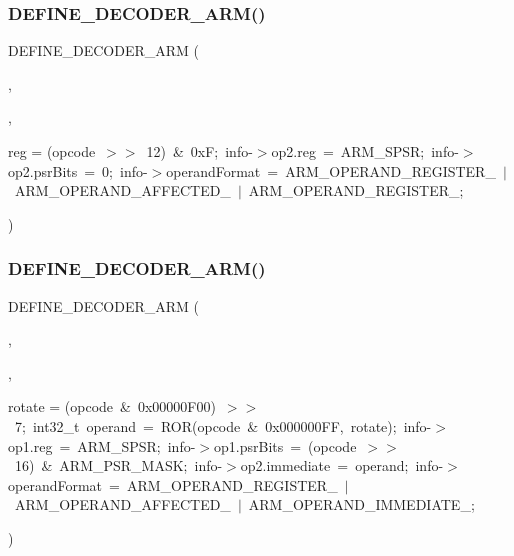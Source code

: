 \subsubsection{\texorpdfstring{D\+E\+F\+I\+N\+E\+\_\+\+D\+E\+C\+O\+D\+E\+R\+\_\+\+A\+R\+M()}{DEFINE\_DECODER\_ARM()}\hspace{0.1cm}{\footnotesize\ttfamily [5/6]}}
{\footnotesize\ttfamily D\+E\+F\+I\+N\+E\+\_\+\+D\+E\+C\+O\+D\+E\+R\+\_\+\+A\+RM (\begin{DoxyParamCaption}\item[{M\+R\+SR}]{,  }\item[{\mbox{\hyperlink{decoder-arm_8c_a08e2b0a56adcc93949282d6c828080ff}{M\+RS}}}]{,  }\item[{\mbox{\hyperlink{libretro_8h_a283ad41e4809f9c0ebe736a9861d8a91}{info}}-\/$>$op1.}]{reg = {\ttfamily (opcode~$>$$>$~12)~\&~0xF;~info-\/$>$op2.reg~=~ARM\+\_\+SPSR;~info-\/$>$op2.psrBits~=~0;~info-\/$>$operandFormat~=~ARM\+\_\+OPERAND\+\_\+REGISTER\+\_~$\vert$~ARM\+\_\+OPERAND\+\_\+AFFECTED\+\_~$\vert$~ARM\+\_\+OPERAND\+\_\+REGISTER\+\_;} }\end{DoxyParamCaption})}

\mbox{\label{decoder-arm_8c_a106888d09814f6e89f6d4e35097a4165}} 
\subsubsection{\texorpdfstring{D\+E\+F\+I\+N\+E\+\_\+\+D\+E\+C\+O\+D\+E\+R\+\_\+\+A\+R\+M()}{DEFINE\_DECODER\_ARM()}\hspace{0.1cm}{\footnotesize\ttfamily [6/6]}}
{\footnotesize\ttfamily D\+E\+F\+I\+N\+E\+\_\+\+D\+E\+C\+O\+D\+E\+R\+\_\+\+A\+RM (\begin{DoxyParamCaption}\item[{M\+S\+R\+RI}]{,  }\item[{\mbox{\hyperlink{decoder-arm_8c_ad9c5d760c45ba502ddfe54752058d02e}{M\+SR}}}]{,  }\item[{\mbox{\hyperlink{ioapi_8h_a787fa3cf048117ba7123753c1e74fcd6}{int}}}]{rotate = {\ttfamily (opcode~\&~0x00000F00)~$>$$>$~7;~int32\+\_\+t~operand~=~ROR(opcode~\&~0x000000FF,~rotate);~info-\/$>$op1.reg~=~ARM\+\_\+SPSR;~info-\/$>$op1.psrBits~=~(opcode~$>$$>$~16)~\&~ARM\+\_\+PSR\+\_\+MASK;~info-\/$>$op2.immediate~=~operand;~info-\/$>$operandFormat~=~ARM\+\_\+OPERAND\+\_\+REGISTER\+\_~$\vert$~ARM\+\_\+OPERAND\+\_\+AFFECTED\+\_~$\vert$~ARM\+\_\+OPERAND\+\_\+IMMEDIATE\+\_;} }\end{DoxyParamCaption})}



